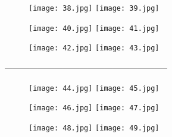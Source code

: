 \begin{figure}[!htbp]
%
\centering
\texttt{[image: 38.jpg]}
\subcaption{}
\endminipage\hfill
{}%
\centering
\texttt{[image: 39.jpg]}
\endminipage\hfill
\caption{}
\end{figure}



\begin{figure}[!htbp]
%
\centering
\texttt{[image: 40.jpg]}
\subcaption{}
\endminipage\hfill
{}%
\centering
\texttt{[image: 41.jpg]}
\endminipage\hfill
\caption{}
\end{figure}



\begin{figure}[!htbp]
%
\centering
\texttt{[image: 42.jpg]}
\subcaption{}
\endminipage\hfill
{}%
\centering
\texttt{[image: 43.jpg]}
\endminipage\hfill
\caption{}
\end{figure}

-----------------------------------------------------------
\begin{figure}[!htbp]
%
\centering
\texttt{[image: 44.jpg]}
\subcaption{}
\endminipage\hfill
{}%
\centering
\texttt{[image: 45.jpg]}
\endminipage\hfill
\caption{}
\end{figure}


\begin{figure}[!htbp]
%
\centering
\texttt{[image: 46.jpg]}
\subcaption{}
\endminipage\hfill
{}%
\centering
\texttt{[image: 47.jpg]}
\endminipage\hfill
\caption{}
\end{figure}



\begin{figure}[!htbp]
%
\centering
\texttt{[image: 48.jpg]}
\subcaption{}
\endminipage\hfill
{}%
\centering
\texttt{[image: 49.jpg]}
\endminipage\hfill
\caption{}
\end{figure}




